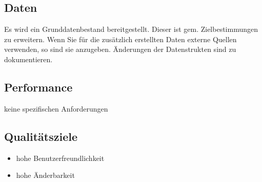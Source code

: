 \subsection{Daten}
Es wird ein Grunddatenbestand bereitgestellt. Dieser ist gem. Zielbestimmungen zu erweitern. Wenn Sie für die zusätzlich erstellten Daten externe Quellen verwenden, so sind sie anzugeben. Änderungen der Datenstrukten sind zu dokumentieren.
\subsection{Performance}
keine spezifischen Anforderungen
\subsection{Qualitätsziele}
\begin{itemize}
  \item hohe Benutzerfreundlichkeit
  \item hohe Änderbarkeit
\end{itemize}
